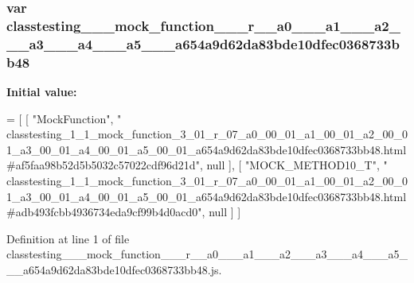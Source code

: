 \subsubsection[{\texorpdfstring{classtesting\+\_\+1\+\_\+1\+\_\+mock\+\_\+function\+\_\+3\+\_\+01\+\_\+r\+\_\+07\+\_\+a0\+\_\+00\+\_\+01\+\_\+a1\+\_\+00\+\_\+01\+\_\+a2\+\_\+00\+\_\+01\+\_\+a3\+\_\+00\+\_\+01\+\_\+a4\+\_\+00\+\_\+01\+\_\+a5\+\_\+00\+\_\+01\+\_\+a654a9d62da83bde10dfec0368733bb48}{classtesting_1_1_mock_function_3_01_r_07_a0_00_01_a1_00_01_a2_00_01_a3_00_01_a4_00_01_a5_00_01_a654a9d62da83bde10dfec0368733bb48}}]{\setlength{\rightskip}{0pt plus 5cm}var classtesting\+\_\+\_\+\_\+mock\+\_\+function\+\_\+\_\+\_\+r\+\_\+\_\+a0\+\_\+\_\+\_\+a1\+\_\+\_\+\_\+a2\+\_\+\_\+\_\+a3\+\_\+\_\+\_\+a4\+\_\+\_\+\_\+a5\+\_\+\_\+\_\+a654a9d62da83bde10dfec0368733bb48}\hypertarget{classtesting__1__1__mock__function__3__01__r__07__a0__00__01__a1__00__01__a2__00__01__a3__00__01aaf32f87b72c38b6f4c857e5cc973a07_ae0fdf8314d7f32c529d5aea19f2964b2}{}\label{classtesting__1__1__mock__function__3__01__r__07__a0__00__01__a1__00__01__a2__00__01__a3__00__01aaf32f87b72c38b6f4c857e5cc973a07_ae0fdf8314d7f32c529d5aea19f2964b2}
{\bfseries Initial value\+:}
\begin{DoxyCode}
=
[
    [ \textcolor{stringliteral}{"MockFunction"}, \textcolor{stringliteral}{"
      classtesting\_1\_1\_mock\_function\_3\_01\_r\_07\_a0\_00\_01\_a1\_00\_01\_a2\_00\_01\_a3\_00\_01\_a4\_00\_01\_a5\_00\_01\_a654a9d62da83bde10dfec0368733bb48.html#af5faa98b52d5b5032c57022cdf96d21d"}, null ],
    [ \textcolor{stringliteral}{"MOCK\_METHOD10\_T"}, \textcolor{stringliteral}{"
      classtesting\_1\_1\_mock\_function\_3\_01\_r\_07\_a0\_00\_01\_a1\_00\_01\_a2\_00\_01\_a3\_00\_01\_a4\_00\_01\_a5\_00\_01\_a654a9d62da83bde10dfec0368733bb48.html#adb493fcbb4936734eda9cf99b4d0acd0"}, null ]
]
\end{DoxyCode}


Definition at line 1 of file classtesting\+\_\+\_\+\_\+mock\+\_\+function\+\_\+\_\+\_\+r\+\_\+\_\+a0\+\_\+\_\+\_\+a1\+\_\+\_\+\_\+a2\+\_\+\_\+\_\+a3\+\_\+\_\+\_\+a4\+\_\+\_\+\_\+a5\+\_\+\_\+\_\+a654a9d62da83bde10dfec0368733bb48.\+js.

